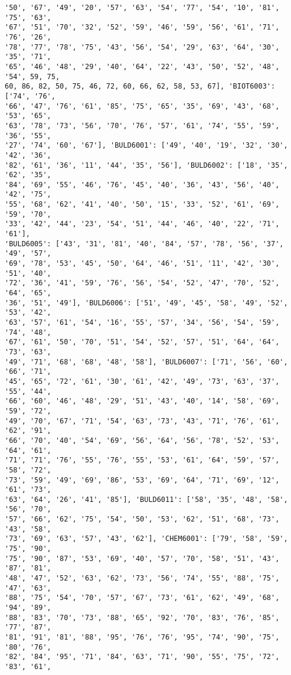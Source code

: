 \documentclass[11pt]{article}
\begin{document}
\begin{Verbatim}[commandchars=\\\{\}]
'50', '67', '49', '20', '57', '63', '54', '77', '54', '10', '81', '75', '63',
'67', '51', '70', '32', '52', '59', '46', '59', '56', '61', '71', '76', '26',
'78', '77', '78', '75', '43', '56', '54', '29', '63', '64', '30', '35', '71',
'65', '46', '48', '29', '40', '64', '22', '43', '50', '52', '48', '54', 59, 75,
60, 86, 82, 50, 75, 46, 72, 60, 66, 62, 58, 53, 67], 'BIOT6003': ['74', '76',
'66', '47', '76', '61', '85', '75', '65', '35', '69', '43', '68', '53', '65',
'63', '78', '73', '56', '70', '76', '57', '61', '74', '55', '59', '36', '55',
'27', '74', '60', '67'], 'BULD6001': ['49', '40', '19', '32', '30', '42', '36',
'82', '61', '36', '11', '44', '35', '56'], 'BULD6002': ['18', '35', '62', '35',
'84', '69', '55', '46', '76', '45', '40', '36', '43', '56', '40', '42', '75',
'55', '68', '62', '41', '40', '50', '15', '33', '52', '61', '69', '59', '70',
'33', '42', '44', '23', '54', '51', '44', '46', '40', '22', '71', '61'],
'BULD6005': ['43', '31', '81', '40', '84', '57', '78', '56', '37', '49', '57',
'69', '78', '53', '45', '50', '64', '46', '51', '11', '42', '30', '51', '40',
'72', '36', '41', '59', '76', '56', '54', '52', '47', '70', '52', '64', '65',
'36', '51', '49'], 'BULD6006': ['51', '49', '45', '58', '49', '52', '53', '42',
'63', '57', '61', '54', '16', '55', '57', '34', '56', '54', '59', '74', '48',
'67', '61', '50', '70', '51', '54', '52', '57', '51', '64', '64', '73', '63',
'49', '71', '68', '68', '48', '58'], 'BULD6007': ['71', '56', '60', '66', '71',
'45', '65', '72', '61', '30', '61', '42', '49', '73', '63', '37', '55', '44',
'66', '60', '46', '48', '29', '51', '43', '40', '14', '58', '69', '59', '72',
'49', '70', '67', '71', '54', '63', '73', '43', '71', '76', '61', '62', '91',
'66', '70', '40', '54', '69', '56', '64', '56', '78', '52', '53', '64', '61',
'71', '71', '76', '55', '76', '55', '53', '61', '64', '59', '57', '58', '72',
'73', '59', '49', '69', '86', '53', '69', '64', '71', '69', '12', '61', '73',
'63', '64', '26', '41', '85'], 'BULD6011': ['58', '35', '48', '58', '56', '70',
'57', '66', '62', '75', '54', '50', '53', '62', '51', '68', '73', '43', '58',
'73', '69', '63', '57', '43', '62'], 'CHEM6001': ['79', '58', '59', '75', '90',
'75', '90', '87', '53', '69', '40', '57', '70', '58', '51', '43', '87', '81',
'48', '47', '52', '63', '62', '73', '56', '74', '55', '88', '75', '47', '63',
'88', '75', '54', '70', '57', '67', '73', '61', '62', '49', '68', '94', '89',
'88', '83', '70', '73', '88', '65', '92', '70', '83', '76', '85', '77', '87',
'81', '91', '81', '88', '95', '76', '76', '95', '74', '90', '75', '80', '76',
'82', '84', '95', '71', '84', '63', '71', '90', '55', '75', '72', '83', '61',

\end{Verbatim}
\end{document}
